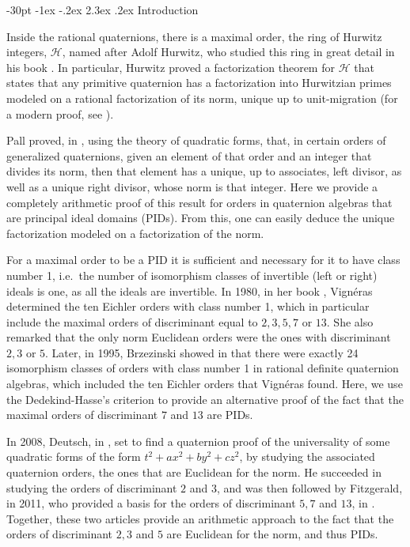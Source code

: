 \documentclass[10pt]{article}
\makeatletter
\renewcommand\section{\@startsection {section}{1}{\z@} {-30pt \@plus
    -1ex \@minus -.2ex} {2.3ex \@plus.2ex}
  {\normalfont\normalsize\bfseries\boldmath}}
\theoremstyle{definition}
\newcommand\hh{\mathcal{H}}
\makeatother
\begin{document}
\section{Introduction}

Inside the rational quaternions, there is a maximal order, the ring of
Hurwitz integers, $\hh$, named after Adolf Hurwitz, who studied this
ring in great detail in his book \cite{Hurwitz}. In particular,
Hurwitz proved a factorization theorem for $\hh$ that states that any
primitive quaternion has a factorization into Hurwitzian primes
modeled on a rational factorization of its norm, unique up to
unit-migration (for a modern proof, see \cite[Thm.~2,
p.~57]{Conway_Smith}).

Pall proved, in \cite[Thm.~2, p.~288]{Pall46}, using the theory of
quadratic forms, that, in certain orders of generalized quaternions,
given an element of that order and an integer that divides its norm,
then that element has a unique, up to associates, left divisor, as
well as a unique right divisor, whose norm is that integer. Here we
provide a completely arithmetic proof of this result for orders in
quaternion algebras that are principal ideal domains (PIDs). From
this, one can easily deduce the unique factorization modeled on a
factorization of the norm.

For a maximal order to be a PID it is sufficient and necessary for it
to have class number 1, i.e.~the number of isomorphism classes of
invertible (left or right) ideals is one, as all the ideals are
invertible. In 1980, in her book \cite{Vigneras}, Vignéras determined
the ten Eichler orders with class number 1, which in particular
include the maximal orders of discriminant equal to
$ 2, 3, 5, 7 \text{ or } 13$. She also remarked that the only norm
Euclidean orders were the ones with discriminant $2, 3 \text{ or }
5$. Later, in 1995, Brzezinski showed in \cite{Brzezinski} that there
were exactly 24 isomorphism classes of orders with class number 1 in
rational definite quaternion algebras, which included the ten Eichler
orders that Vignéras found. Here, we use the Dedekind-Hasse's
criterion to provide an alternative proof of the fact that the maximal
orders of discriminant $7$ and $13$ are PIDs.

In 2008, Deutsch, in \cite{Deutsch}, set to find a quaternion proof of
the universality of some quadratic forms of the form
$t^2 + a x^2 + b y^2 + c z^2$, by studying the associated quaternion
orders, the ones that are Euclidean for the norm. He succeeded in
studying the orders of discriminant $2$ and $3$, and was then followed
by Fitzgerald, in 2011, who provided a basis for the orders of
discriminant $5, 7$ and $13$, in \cite{Fitzgerald}. Together, these
two articles provide an arithmetic approach to the fact that the
orders of discriminant $2, 3$ and $5$ are Euclidean for the norm, and
thus PIDs.
\end{document}
